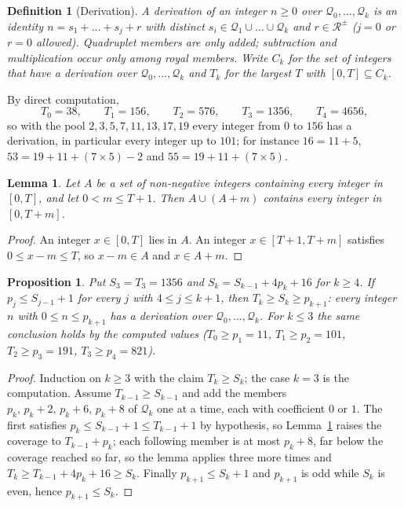 \documentclass[11pt,a4paper]{article}
\newtheorem{definition}{Definition}
\newtheorem{lemma}{Lemma}
\newtheorem{proposition}{Proposition}
\newcommand{\Q}{\mathcal{Q}}
\newcommand{\R}{\mathcal{R}}
\begin{document}
\begin{definition}[Derivation]
A \emph{derivation} of an integer $n\ge0$ over $\Q_0,\dots,\Q_k$ is an
identity $n=s_1+\dots+s_j+r$ with distinct $s_i\in\Q_1\cup\dots\cup\Q_k$
and $r\in\R^{\pm}$ ($j=0$ or $r=0$ allowed). Quadruplet members are only
added; subtraction and multiplication occur only among royal members.
Write $C_k$ for the set of integers that have a derivation over
$\Q_0,\dots,\Q_k$ and $T_k$ for the largest $T$ with $[0,T]\subseteq C_k$.
\end{definition}

By direct computation,
\[
T_0=38,\qquad T_1=156,\qquad T_2=576,\qquad T_3=1356,\qquad T_4=4656,
\]
so with the pool $2,3,5,7,11,13,17,19$ every integer from $0$ to $156$ has
a derivation, in particular every integer up to $101$; for instance
$16=11+5$, $53=19+11+(7\times5)-2$ and $55=19+11+(7\times5)$.

\begin{lemma}
\label{lem:extend}
Let $A$ be a set of non-negative integers containing every integer in
$[0,T]$, and let $0<m\le T+1$. Then $A\cup(A+m)$ contains every integer in
$[0,T+m]$.
\end{lemma}
\begin{proof}
An integer $x\in[0,T]$ lies in $A$. An integer $x\in[T+1,T+m]$ satisfies
$0\le x-m\le T$, so $x-m\in A$ and $x\in A+m$.
\end{proof}

\begin{proposition}
\label{prop:cover}
Put $S_3=T_3=1356$ and $S_k=S_{k-1}+4p_k+16$ for $k\ge4$. If
$p_j\le S_{j-1}+1$ for every $j$ with $4\le j\le k+1$, then
$T_k\ge S_k\ge p_{k+1}$: every integer $n$ with $0\le n\le p_{k+1}$ has a
derivation over $\Q_0,\dots,\Q_k$. For $k\le 3$ the same conclusion holds
by the computed values ($T_0\ge p_1=11$, $T_1\ge p_2=101$,
$T_2\ge p_3=191$, $T_3\ge p_4=821$).
\end{proposition}
\begin{proof}
Induction on $k\ge3$ with the claim $T_k\ge S_k$; the case $k=3$ is the
computation. Assume $T_{k-1}\ge S_{k-1}$ and add the members
$p_k,\,p_k+2,\,p_k+6,\,p_k+8$ of $\Q_k$ one at a time, each with
coefficient $0$ or $1$. The first satisfies $p_k\le S_{k-1}+1\le T_{k-1}+1$
by hypothesis, so Lemma~\ref{lem:extend} raises the coverage to
$T_{k-1}+p_k$; each following member is at most $p_k+8$, far below the
coverage reached so far, so the lemma applies three more times and
$T_k\ge T_{k-1}+4p_k+16\ge S_k$. Finally $p_{k+1}\le S_k+1$ and $p_{k+1}$
is odd while $S_k$ is even, hence $p_{k+1}\le S_k$.
\end{proof}
\end{document}
